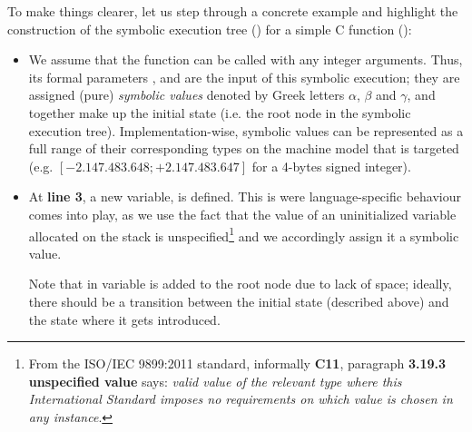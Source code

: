To make things clearer, let us step through a concrete example and highlight
the construction of the symbolic execution tree
() for a simple C function
():
\begin{itemize}
  \newcommand{\pa}{\hltexttt{a}}
  \newcommand{\pb}{\hltexttt{b}}
  \newcommand{\pc}{\hltexttt{c}}
  \newcommand{\vmax}{\hltexttt{max}}

  \item We assume that the  function can be called with any
    integer arguments.  Thus, its formal parameters \pa{}, \pb{} and \pc{} are
    the input of this symbolic execution; they are assigned (pure)
    \emph{symbolic values} denoted by Greek letters $\alpha$, $\beta$ and
    $\gamma$, and together make up the initial state (i.e. the root node in the
    symbolic execution tree).  Implementation-wise, symbolic values can be
    represented as a full range of their corresponding types on the machine
    model that is targeted (e.g. $[-2.147.483.648; +2.147.483.647]$ for a
    4-bytes signed integer).

  \item At \textbf{line 3}, a new variable, \vmax{} is defined.  This is were
    language-specific behaviour comes into play, as we use the fact that the
    value of an uninitialized variable allocated on the stack is
    unspecified\footnote{From the ISO/IEC 9899:2011 standard, informally
    \textbf{C11}, paragraph \textbf{3.19.3 unspecified value} says: \emph{valid
    value of the relevant type where this International Standard imposes no
    requirements on which value is chosen in any instance}.} and we accordingly
    assign it a symbolic value.

    Note that in  variable \vmax{} is
    added to the root node due to lack of space; ideally, there should be a
    transition between the initial state (described above) and the state where
    it gets introduced.


\end{itemize}
